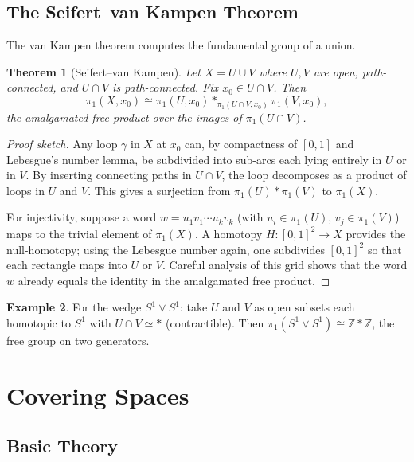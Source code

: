 \documentclass[12pt,a4paper]{amsart}
\newtheorem{theorem}{Theorem}[section]
\theoremstyle{definition}
\newtheorem{example}[theorem]{Example}
\begin{document}
\subsection{The Seifert--van Kampen Theorem}

The van Kampen theorem computes the fundamental group of a union.

\begin{theorem}[Seifert--van Kampen]
\label{thm:vankampen}
Let $X = U \cup V$ where $U, V$ are open, path-connected, and $U \cap V$
is path-connected. Fix $x_0 \in U \cap V$. Then
\[
  \pi_1(X, x_0) \cong \pi_1(U, x_0) *_{\pi_1(U \cap V, x_0)} \pi_1(V, x_0),
\]
the \emph{amalgamated free product} over the images of $\pi_1(U \cap V)$.
\end{theorem}
\begin{proof}[Proof sketch]
Any loop $\gamma$ in $X$ at $x_0$ can, by compactness of $[0,1]$ and Lebesgue's
number lemma, be subdivided into sub-arcs each lying entirely in $U$ or in $V$.
By inserting connecting paths in $U \cap V$, the loop decomposes as a product
of loops in $U$ and $V$. This gives a surjection from
$\pi_1(U) * \pi_1(V)$ to $\pi_1(X)$.

For injectivity, suppose a word $w = u_1 v_1 \cdots u_k v_k$ (with $u_i \in \pi_1(U)$,
$v_j \in \pi_1(V)$) maps to the trivial element of $\pi_1(X)$. A homotopy
$H\colon [0,1]^2 \to X$ provides the null-homotopy; using the Lebesgue number
again, one subdivides $[0,1]^2$ so that each rectangle maps into $U$ or $V$.
Careful analysis of this grid shows that the word $w$ already equals the identity
in the amalgamated free product.
\end{proof}

\begin{example}
For the wedge $S^1 \vee S^1$: take $U$ and $V$ as open subsets each homotopic
to $S^1$ with $U \cap V \simeq *$ (contractible). Then
$\pi_1(S^1 \vee S^1) \cong \mathbb{Z} * \mathbb{Z}$, the free group on two
generators.
\end{example}

\section{Covering Spaces}
\label{sec:covering}

\subsection{Basic Theory}
\end{document}
